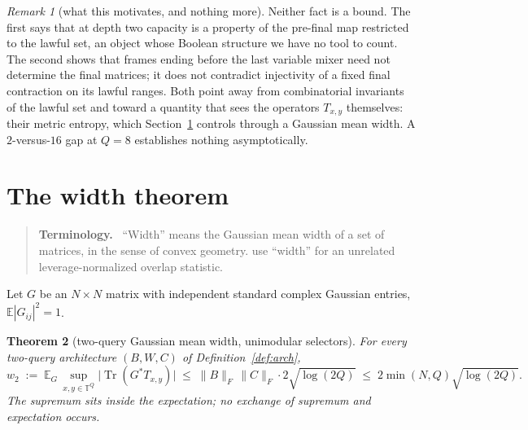 \documentclass[11pt,a4paper]{article}
\theoremstyle{plain}
\newtheorem{theorem}{Theorem}[section]
\theoremstyle{definition}
\theoremstyle{remark}
\newtheorem{remark}[theorem]{Remark}
\DeclareMathOperator{\Tr}{Tr}
\newcommand{\T}{\mathbb T}
\newcommand{\E}{\mathbb E}
\newcommand{\Fro}[1]{\|#1\|_F}
\newenvironment{callout}[1]{\par\medskip\noindent\begin{quote}\small\textbf{#1}\ }{\end{quote}\medskip}
\begin{document}
\begin{remark}[what this motivates, and nothing more]\label{rem:motivates}
Neither fact is a bound. The first says that at depth two capacity is a property of the
pre-final map restricted to the lawful set, an object whose Boolean structure we have no
tool to count. The second shows that frames ending before the last variable mixer
need not determine the final matrices; it does not contradict injectivity of a fixed
final contraction on its lawful ranges. Both point
away from combinatorial invariants of the lawful set and toward a quantity that sees the
operators $T_{x,y}$ themselves: their metric entropy, which Section~\ref{sec:width} controls
through a Gaussian mean width. A $2$-versus-$16$ gap at $Q=8$ establishes nothing
asymptotically.
\end{remark}

\section{The width theorem}\label{sec:width}

\begin{callout}{Terminology.}
``Width'' means the Gaussian mean width of a set of matrices, in the sense of convex
geometry. \cite[Lem.~4.11]{LMW24} use ``width'' for an unrelated leverage-normalized overlap
statistic.
\end{callout}

Let $G$ be an $N\times N$ matrix with independent standard complex Gaussian entries,
$\E|G_{ij}|^2=1$.

\begin{theorem}[two-query Gaussian mean width, unimodular selectors]\label{thm:width}
For every two-query architecture $(B,W,C)$ of Definition~\ref{def:arch},
\[
w_2\;:=\;\E_G\,\sup_{x,y\in\T^Q}\bigl|\Tr(G^{*}T_{x,y})\bigr|
\;\le\;\Fro{B}\,\Fro{C}\cdot2\sqrt{\log(2Q)}
\;\le\;2\min(N,Q)\sqrt{\log(2Q)}.
\]
The supremum sits inside the expectation; no exchange of supremum and expectation occurs.
\end{theorem}
\end{document}

